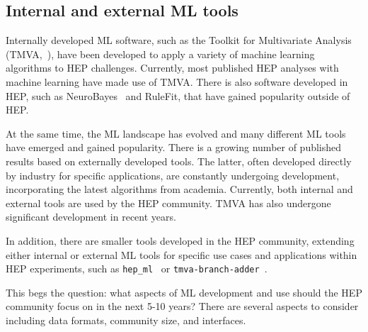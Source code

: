 \subsection{Internal and external ML tools}


Internally developed ML software, such as the Toolkit for Multivariate Analysis (TMVA,~\cite{TMVA}), have been developed to apply a variety of machine learning algorithms to HEP challenges. Currently, most published HEP analyses with machine learning have made use of TMVA. There is also software developed in HEP, such as NeuroBayes~\cite{neurobayes,neurobayes2} and RuleFit, that have gained popularity outside of HEP.

At the same time, the ML landscape has evolved and many different ML tools have emerged and gained popularity. There is a growing number of published results based on externally developed tools. The latter, often developed directly by industry for specific applications, are constantly undergoing development, incorporating the latest algorithms from academia. Currently, both internal and external tools are used by the HEP community. TMVA has also undergone significant development in recent years.

In addition, there are smaller tools developed in the HEP community, extending either internal or external ML tools for specific use cases and applications within HEP experiments, such as \texttt{hep\_ml}~\cite{hep_ml} or \texttt{tmva-branch-adder}~\cite{tmva-branch-adder}.

This begs the question: what aspects of ML development and use should the HEP community focus on in the next 5-10 years? There are several aspects to consider including data formats, community size, and interfaces.

